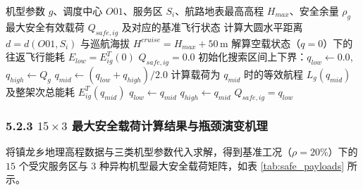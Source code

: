 \documentclass[withoutpreface,bwprint]{format}
\begin{document}
\begin{algorithm}[H]
\caption{基于物理能耗二分搜索的最大安全载荷解算算法}
\label{alg:bisection}
\begin{algorithmic}[1]
\Require 机型参数 $g$、调度中心 $O01$、服务区 $S_i$、航路地表最高高程 $H_{max}$、安全余量 $\rho_g$
\Ensure 最大安全有效载荷 $Q_{safe, ig}$ 及对应的基准飞行状态
\State 计算大圆水平距离 $d = d(O01, S_i)$ 与巡航海拔 $H^{cruise} = H_{max} + 50\,\text{m}$
\State 解算空载状态（$q=0$）下的往返飞行能耗 $E_{low} = E_{ig}^T(0)$
    \State \Return $Q_{safe, ig} = 0.0$ 
\EndIf
\State 初始化搜索区间上下界：$q_{low} \gets 0.0$, $q_{high} \gets Q_g$
    \State $q_{mid} \gets (q_{low} + q_{high}) / 2.0$
    \State 计算载荷为 $q_{mid}$ 时的等效航程 $L_g(q_{mid})$ 及整架次总能耗 $E_{ig}^T(q_{mid})$
        \State $q_{low} \gets q_{mid}$ 
    \Else
        \State $q_{high} \gets q_{mid}$ 
    \EndIf
\EndFor
\State \Return $Q_{safe, ig} = q_{low}$
\end{algorithmic}
\end{algorithm}

\subsubsection{\texorpdfstring{5.2.3 $15\times 3$ 最大安全载荷计算结果与瓶颈演变机理}{5.2.3 15x3 最大安全载荷计算结果与瓶颈演变机理}}
将镇龙乡地理高程数据与三类机型参数代入求解，得到基准工况（$\rho=20\%$）下的 $15$ 个受灾服务区与 $3$ 种异构机型最大安全载荷矩阵，如表 \ref{tab:safe_payloads} 所示。
\end{document}
